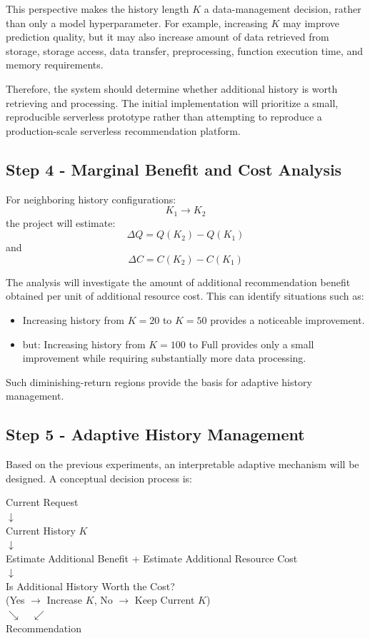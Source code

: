\documentclass[12pt,a4paper]{article}
\begin{document}
This perspective makes the history length $K$ a data-management decision, rather than only a model hyperparameter. For example, increasing $K$ may improve prediction quality, but it may also increase amount of data retrieved from storage, storage access, data transfer, preprocessing, function execution time, and memory requirements.

Therefore, the system should determine whether additional history is worth retrieving and processing. The initial implementation will prioritize a small, reproducible serverless prototype rather than attempting to reproduce a production-scale serverless recommendation platform.

\subsection{Step 4 - Marginal Benefit and Cost Analysis}
For neighboring history configurations:
\[ K_1 \rightarrow K_2 \]
the project will estimate:
\[ \Delta Q = Q(K_2) - Q(K_1) \]
and
\[ \Delta C = C(K_2) - C(K_1) \]

The analysis will investigate the amount of additional recommendation benefit obtained per unit of additional resource cost. This can identify situations such as:
\begin{itemize}
    \item Increasing history from $K=20$ to $K=50$ provides a noticeable improvement.
    \item but: Increasing history from $K=100$ to Full provides only a small improvement while requiring substantially more data processing.
\end{itemize}
Such diminishing-return regions provide the basis for adaptive history management.

\subsection{Step 5 - Adaptive History Management}
Based on the previous experiments, an interpretable adaptive mechanism will be designed. A conceptual decision process is:

\begin{center}
Current Request \\
$\downarrow$ \\
Current History $K$ \\
$\downarrow$ \\
Estimate Additional Benefit + Estimate Additional Resource Cost \\
$\downarrow$ \\
Is Additional History Worth the Cost? \\
(Yes $\rightarrow$ Increase $K$, No $\rightarrow$ Keep Current $K$) \\
$\searrow \quad \swarrow$ \\
Recommendation
\end{center}
\end{document}
